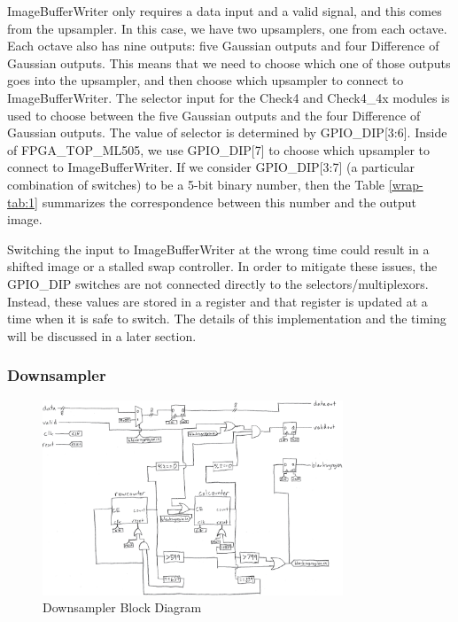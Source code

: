 ImageBufferWriter only requires a data input and a valid signal, and this comes 
from the upsampler. In this case, we have two upsamplers, one from each octave. 
Each octave also has nine outputs: five Gaussian outputs and four Difference of 
Gaussian outputs. This means that we need to choose which one of those outputs 
goes into the upsampler, and then choose which upsampler to connect to 
ImageBufferWriter. The selector input for the Check4 and Check4\_4x modules is 
used to choose between the five Gaussian outputs and the four Difference of 
Gaussian outputs. The value of selector is determined by GPIO\_DIP[3:6]. Inside 
of FPGA\_TOP\_ML505, we use GPIO\_DIP[7] to choose which upsampler to connect to 
ImageBufferWriter. If we consider GPIO\_DIP[3:7] (a particular combination of 
switches) to be a 5-bit binary number, then the Table \ref{wrap-tab:1} summarizes the
correspondence between this number and the output image.


Switching the input to ImageBufferWriter at the wrong time could result in 
a shifted image or a stalled swap controller. In order to mitigate these issues, 
the GPIO\_DIP switches are not connected directly to the selectors/multiplexors. 
Instead, these values are stored in a register and that register is updated at 
a time when it is safe to switch. The details of this implementation and the 
timing will be discussed in a later section.


\subsubsection{Downsampler}

\begin{figure}
    \centering
    \includegraphics[width=0.8\textwidth]{processed_image_pngs/Downsampler.png}
    \caption{Downsampler Block Diagram}
    \label{fig:downsampler}
\end{figure}


